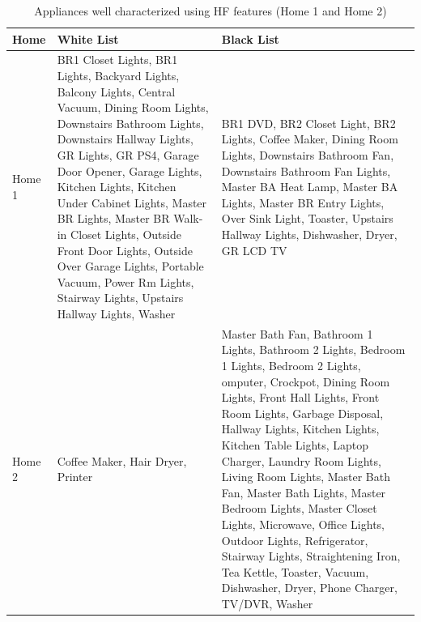 \documentclass[11pt, letterpaper]{article}
\begin{document}
\begin{table}[H]
\caption{Appliances well characterized using HF features (Home 1 and Home 2)}
\begin{center}
\begin{tabular}{|p{2cm}|p{6.0cm}|p{7.0cm}|}\hline
\textbf{Home} & \textbf{White List} & \textbf{Black List}\\
\hline
Home 1 & 
BR1 Closet Lights,
BR1 Lights,
Backyard Lights,
Balcony Lights,
Central Vacuum,
Dining Room Lights,
Downstairs Bathroom Lights,
Downstairs Hallway Lights,
GR Lights,
GR PS4,
Garage Door Opener,
Garage Lights,
Kitchen Lights,
Kitchen Under Cabinet Lights,
Master BR Lights,
Master BR Walk-in Closet Lights,
Outside Front Door Lights,
Outside Over Garage Lights,
Portable Vacuum,
Power Rm Lights,
Stairway Lights,
Upstairs Hallway Lights,
Washer
&
BR1 DVD, BR2 Closet Light, BR2 Lights, Coffee Maker, Dining Room Lights, Downstairs Bathroom Fan, Downstairs Bathroom Fan Lights, Master BA Heat Lamp, Master BA Lights, Master BR Entry Lights, Over Sink Light, Toaster, Upstairs Hallway Lights, Dishwasher, Dryer, GR LCD TV
\\
\hline
Home 2 & 
Coffee Maker,
Hair Dryer,
Printer
&
Master Bath Fan, Bathroom 1 Lights, Bathroom 2 Lights, Bedroom 1 Lights, Bedroom 2 Lights, omputer, Crockpot, Dining Room Lights, Front Hall Lights, Front Room Lights, Garbage Disposal, Hallway Lights, Kitchen Lights, Kitchen Table Lights, Laptop Charger, Laundry Room Lights, Living Room Lights, Master Bath Fan, Master Bath Lights, Master Bedroom Lights, Master Closet Lights, Microwave, Office Lights, Outdoor Lights, Refrigerator, Stairway Lights, Straightening Iron, Tea Kettle, Toaster, Vacuum,
Dishwasher, Dryer, Phone Charger, TV/DVR, Washer
\\
\hline
\end{tabular}
\end{center}
\label{tab:HFList}
\end{table}
\end{document}
